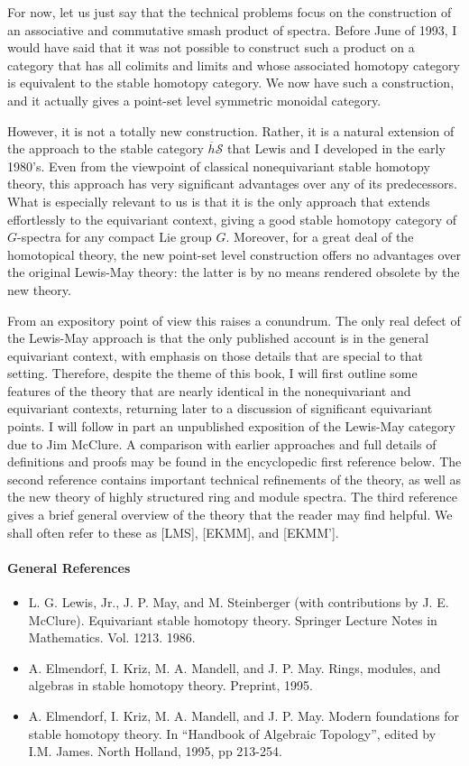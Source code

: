 For now, let us just say that the technical problems focus on the construction of an associative and commutative smash product of spectra. Before June of 1993, I would have said that it was not possible to construct such a product on a category that has all colimits and limits and whose associated homotopy category is equivalent to the stable homotopy category. We now have such a construction, and it actually gives a point-set level symmetric monoidal category.

However, it is not a totally new construction. Rather, it is a natural extension of the approach to the stable category $\overline{h}\mathscr{S}$ that Lewis and I developed in the early 1980's. Even from the viewpoint of classical nonequivariant stable homotopy theory, this approach has very significant advantages over any of its predecessors. What is especially relevant to us is that it is the only approach that extends effortlessly to the equivariant context, giving a good stable homotopy category of $G$-spectra for any compact Lie group $G$. Moreover, for a great deal of the homotopical theory, the new point-set level construction offers no advantages over the original Lewis-May theory: the latter is by no means rendered obsolete by the new theory.

From an expository point of view this raises a conundrum. The only real defect of the Lewis-May approach is that the only published account is in the general equivariant context, with emphasis on those details that are special to that setting. Therefore, despite the theme of this book, I will first outline some features of the theory that are nearly identical in the nonequivariant and equivariant contexts, returning later to a discussion of significant equivariant points. I will follow in part an unpublished exposition of the Lewis-May category due to Jim McClure. A comparison with earlier approaches and full details of definitions and proofs may be found in the encyclopedic first reference below. The second reference contains important technical refinements of the theory, as well as the new theory of highly structured ring and module spectra. The third reference gives a brief general overview of the theory that the reader may find helpful. We shall often refer to these as [LMS], [EKMM], and [EKMM'].

\paragraph{General References}
\begin{itemize}
    \item[{[LMS]}] L. G. Lewis, Jr., J. P. May, and M. Steinberger (with contributions by J. E. McClure). Equivariant stable homotopy theory. Springer Lecture Notes in Mathematics. Vol. 1213. 1986.
    \item[{[EKMM]}] A. Elmendorf, I. Kriz, M. A. Mandell, and J. P. May. Rings, modules, and algebras in stable homotopy theory. Preprint, 1995.
    \item[{[EKMM']}] A. Elmendorf, I. Kriz, M. A. Mandell, and J. P. May. Modern foundations for stable homotopy theory. In ``Handbook of Algebraic Topology'', edited by I.M. James. North Holland, 1995, pp 213-254.
\end{itemize}

